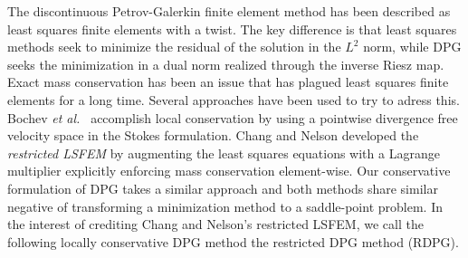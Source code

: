 \documentclass[letterpaper]{article}
\def\etal{{\it et al.~}}
\begin{document}
The discontinuous Petrov-Galerkin finite element method has been described as
least squares finite elements with a twist. The key difference is that least
squares methods seek to minimize the residual of the solution in the $L^2$
norm, while DPG seeks the minimization in a dual norm realized through the
inverse Riesz map. Exact mass conservation has been an issue that has plagued
least squares finite elements for a long time. Several approaches have been
used to try to adress this. Bochev \etal\cite{Bochev2010} accomplish local
conservation by using a pointwise divergence free velocity space in the Stokes
formulation.  Chang and Nelson\cite{ChangNelson1997} developed the
\emph{restricted LSFEM}\cite{ChangNelson1997} by augmenting the least squares
equations with a Lagrange multiplier explicitly enforcing mass conservation
element-wise. Our conservative formulation of DPG takes a similar approach and
both methods share similar negative of transforming a minimization method to a
saddle-point problem. In the interest of crediting Chang and Nelson's
restricted LSFEM, we call the following locally conservative DPG method the
restricted DPG method (RDPG).
\end{document}
